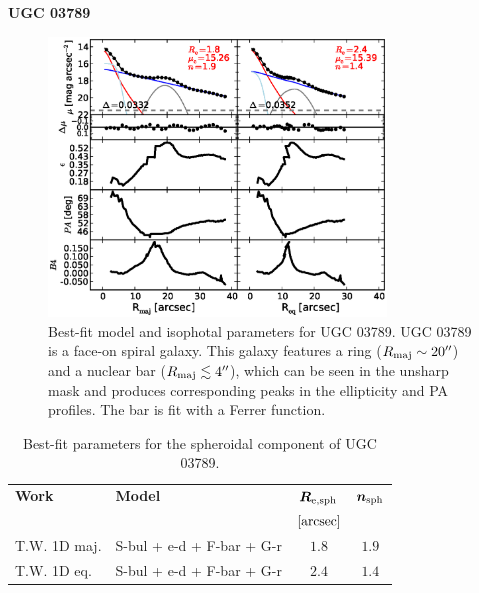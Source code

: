 \documentclass[preprint2]{emulateapj}
\newcommand{\fitfigurewidth}{0.8\textwidth}
\begin{document}
  \clearpage\newpage\noindent
  {\bf UGC 03789 \\}

  \begin{figure}[h]
  \begin{center}
  \includegraphics[width=\fitfigurewidth]{images/ugc03789_1Dfit.eps}
  \caption{Best-fit model and isophotal parameters for UGC 03789.
  UGC 03789 is a face-on spiral galaxy.
  This galaxy features a ring ($R_{\rm maj} \sim 20''$) and a nuclear bar ($R_{\rm maj} \lesssim 4''$),
  which can be seen in the unsharp mask and produces corresponding peaks in the ellipticity and PA profiles.
  The bar is fit with a Ferrer function.
  }
  \end{center}
  \end{figure}

  \begin{table}[h]
  \small
  \caption{Best-fit parameters for the spheroidal component of UGC 03789.}
  \begin{center}
  \begin{tabular}{llcc}
  \hline
  {\bf Work} & {\bf Model}   & $\bm R_{\rm e,sph}$    & $\bm n_{\rm sph}$ \\
    &  &  $[\rm arcsec]$ & \\
  \hline
  T.W. 1D maj. & S-bul + e-d + F-bar + G-r & $1.8$  &  $1.9$ \\
  T.W. 1D eq.  & S-bul + e-d + F-bar + G-r & $2.4$  &  $1.4$ \\
  \hline
  \end{tabular}
  \end{center}
  \label{tab:ugc3789}
  \end{table}
\end{document}
